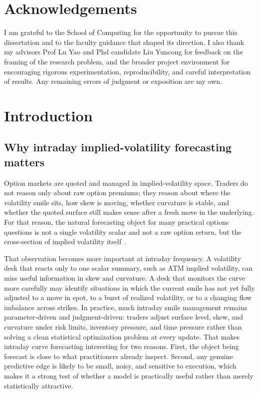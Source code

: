 \documentclass[12pt]{report}
\begin{document}
\cleardoublepage
\chapter*{Acknowledgements}
I am grateful to the School of Computing for the opportunity to pursue this dissertation and to the faculty guidance that shaped its direction. I also thank my advisors Prof Lu Yao and Phd candidate Liu Yuncong for feedback on the framing of the research problem, and the broader project environment for encouraging rigorous experimentation, reproducibility, and careful interpretation of results. Any remaining errors of judgment or exposition are my own.

\cleardoublepage
\tableofcontents

\cleardoublepage
\setcounter{page}{1}
\hypersetup{pageanchor=true}

\chapter{Introduction}

\section{Why intraday implied-volatility forecasting matters}
Option markets are quoted and managed in implied-volatility space. Traders do not reason only about raw option premiums; they reason about where the volatility smile sits, how skew is moving, whether curvature is stable, and whether the quoted surface still makes sense after a fresh move in the underlying. For that reason, the natural forecasting object for many practical options questions is not a single volatility scalar and not a raw option return, but the cross-section of implied volatility itself \citep{black1973,dumas1998,cont2002dynamics}.

That observation becomes more important at intraday frequency. A volatility desk that reacts only to one scalar summary, such as ATM implied volatility, can miss useful information in skew and curvature. A desk that monitors the curve more carefully may identify situations in which the current smile has not yet fully adjusted to a move in spot, to a burst of realized volatility, or to a changing flow imbalance across strikes. In practice, much intraday smile management remains parameter-driven and judgment-driven: traders adjust surface level, skew, and curvature under risk limits, inventory pressure, and time pressure rather than solving a clean statistical optimization problem at every update. That makes intraday curve forecasting interesting for two reasons. First, the object being forecast is close to what practitioners already inspect. Second, any genuine predictive edge is likely to be small, noisy, and sensitive to execution, which makes it a strong test of whether a model is practically useful rather than merely statistically attractive.
\end{document}
